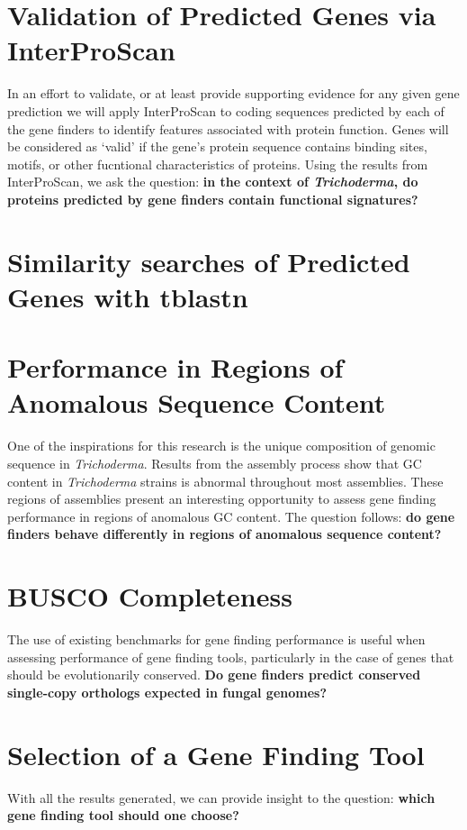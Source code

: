 \section{Validation of Predicted Genes via InterProScan}
\label{rq:interproscan}
In an effort to validate, or at least provide supporting evidence for
any given gene prediction we will apply InterProScan to coding
sequences predicted by each of the gene finders to identify features
associated with protein function. Genes will be considered as `valid'
if the gene's protein sequence contains binding sites, motifs, or
other fucntional characteristics of proteins. Using the results from
InterProScan, we ask the question: \textbf{in the context of
  \textit{Trichoderma}, do proteins predicted by gene finders contain
  functional signatures?}

\section{Similarity searches of Predicted Genes with tblastn}
\label{rq:tblastn}


\section{Performance in Regions of Anomalous Sequence Content}
\label{rq:anomalous-sequence-content}

One of the inspirations for this research is the unique composition of
genomic sequence in \textit{Trichoderma}. Results from the assembly
process show that GC content in \textit{Trichoderma} strains is
abnormal throughout most assemblies. These regions of assemblies
present an interesting opportunity to assess gene finding performance
in regions of anomalous GC content. The question follows: \textbf{do
  gene finders behave differently in regions of anomalous sequence
  content?}

\section{BUSCO Completeness}
\label{rq:busco-completeness}
The use of existing benchmarks for gene finding performance is useful
when assessing performance of gene finding tools, particularly in the
case of genes that should be evolutionarily conserved. \textbf{Do gene
  finders predict conserved single-copy orthologs expected in fungal
  genomes?}

\section{Selection of a Gene Finding Tool}

With all the results generated, we can provide insight to the
question: \textbf{which gene finding tool should one choose?}
